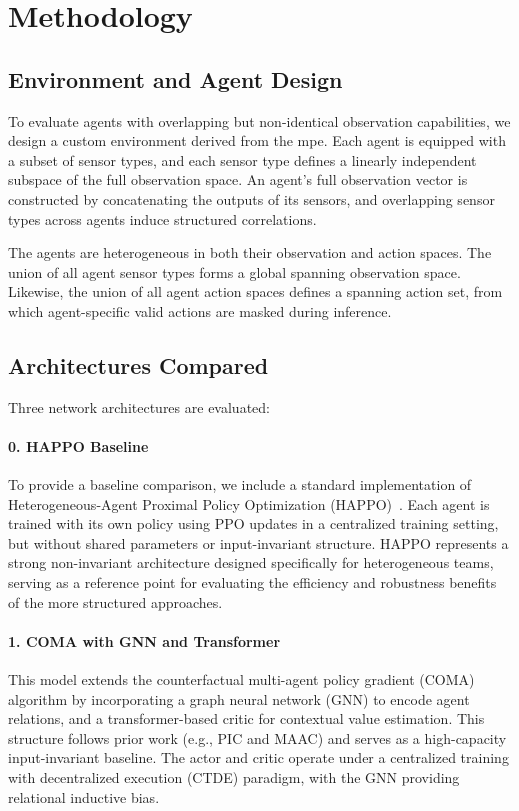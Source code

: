\documentclass{article}
\begin{document}
\section{Methodology}
\label{con2:sec:methodology}

\subsection{Environment and Agent Design}

To evaluate agents with overlapping but non-identical observation capabilities, 
we design a custom environment derived from the \gls{mpe}. 
Each agent is equipped with a subset of sensor types, 
and each sensor type defines a linearly independent subspace of the 
full observation space. An agent's full observation vector is constructed by 
concatenating the outputs of its sensors, and overlapping sensor types across 
agents induce structured correlations.

The agents are heterogeneous in both their observation and action spaces. 
The union of all agent sensor types forms a global spanning observation space. 
Likewise, the union of all agent action spaces defines a spanning action set, 
from which agent-specific valid actions are masked during inference.

\subsection{Architectures Compared}
Three network architectures are evaluated:

\paragraph{0. HAPPO Baseline}
To provide a baseline comparison, we include a standard implementation 
of Heterogeneous-Agent Proximal Policy Optimization (HAPPO)~\cite{zhong2024}. 
Each agent is trained with its own policy using PPO updates in a centralized 
training setting, but without shared parameters or input-invariant structure. 
HAPPO represents a strong non-invariant architecture designed specifically 
for heterogeneous teams, serving as a reference point for evaluating the 
efficiency and robustness benefits of the more structured approaches.

\paragraph{1. COMA with GNN and Transformer}
This model extends the counterfactual multi-agent policy gradient (COMA) 
algorithm by incorporating a graph neural network (GNN) to encode agent relations, 
and a transformer-based critic for contextual value estimation. 
This structure follows prior work (e.g., PIC and MAAC) and 
serves as a high-capacity input-invariant baseline. 
The actor and critic operate under a centralized training with 
decentralized execution (CTDE) paradigm, with the GNN providing relational inductive bias.
\end{document}
